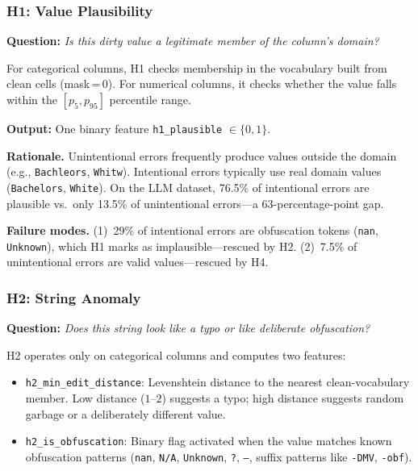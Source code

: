 \documentclass[11pt,a4paper]{article}
\newcommand{\feat}[1]{\texttt{#1}}
\begin{document}
\subsubsection{H1: Value Plausibility}

\textbf{Question:} \emph{Is this dirty value a legitimate member of the column's domain?}

For categorical columns, H1 checks membership in the vocabulary built from
clean cells (mask\,=\,0).  For numerical columns, it checks whether the value
falls within the $[p_5, p_{95}]$ percentile range.

\textbf{Output:} One binary feature \feat{h1\_plausible} $\in \{0, 1\}$.

\textbf{Rationale.}
Unintentional errors frequently produce values outside the domain
(e.g., \texttt{Bachleors}, \texttt{Whitw}).  Intentional errors typically use
real domain values (\texttt{Bachelors}, \texttt{White}).  On the LLM dataset,
76.5\% of intentional errors are plausible vs.\ only 13.5\% of unintentional
errors---a 63-percentage-point gap.

\textbf{Failure modes.}
(1)~29\% of intentional errors are obfuscation tokens
(\texttt{nan}, \texttt{Unknown}), which H1 marks as implausible---rescued by H2.
(2)~7.5\% of unintentional errors are valid values---rescued by H4.

\subsubsection{H2: String Anomaly}

\textbf{Question:} \emph{Does this string look like a typo or like deliberate
obfuscation?}

H2 operates only on categorical columns and computes two features:
\begin{itemize}[nosep]
  \item \feat{h2\_min\_edit\_distance}: Levenshtein distance to the nearest
        clean-vocabulary member.  Low distance ($1$--$2$) suggests a typo;
        high distance suggests random garbage or a deliberately different value.
  \item \feat{h2\_is\_obfuscation}: Binary flag activated when the value
        matches known obfuscation patterns (\texttt{nan}, \texttt{N/A},
        \texttt{Unknown}, \texttt{?}, \texttt{---}, suffix patterns like
        \texttt{-DMV}, \texttt{-obf}).
\end{itemize}
\end{document}
